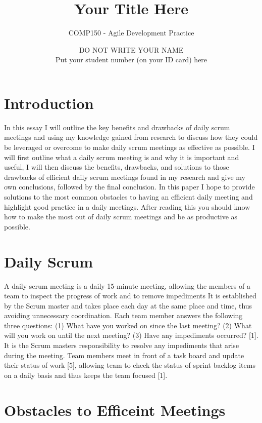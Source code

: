 \documentclass{scrartcl}
\title{Your Title Here}
\subtitle{COMP150 - Agile Development Practice}
\author{DO NOT WRITE YOUR NAME\\Put your student number (on your ID card) here}
\begin{document}
\maketitle


\section{Introduction}

In this essay I will outline the key benefits and drawbacks of daily scrum meetings and using my knowledge gained from research to discuss how they could be leveraged or overcome to make daily scrum meetings as effective as possible. I will first outline what a daily scrum meeting is and why it is important and useful, I will then discuss the benefits, drawbacks, and solutions to those drawbacks of efficient daily scrum meetings found in my research and give my own conclusions, followed by the final conclusion. In this paper I hope to provide solutions to the most common obstacles to having an efficient daily meeting and highlight good practice in a daily meetings. After reading this you should know how to make the most out of daily scrum meetings and be as productive as possible.

\section{Daily Scrum}

A daily scrum meeting is a daily 15-minute meeting, allowing the members of a team to inspect the progress of work and to remove impediments It is established by the Scrum master and takes place each day at the same place and time, thus avoiding unnecessary coordination. Each team member answers the following three questions: (1) What have you worked on since the last meeting? (2) What will you work on until the next meeting? (3) Have any impediments occurred? [1]. It is the Scrum masters responsibility to resolve any impediments that arise during the meeting. Team members meet in front of a task board and update their status of work [5], allowing team to check the status of sprint backlog items on a daily basis and thus keeps the team focused [1].

\section{Obstacles to Efficeint Meetings}
\end{document}
